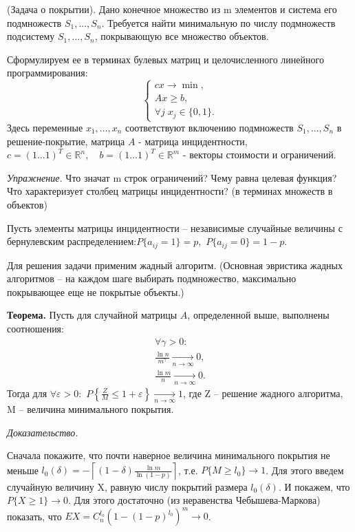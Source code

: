\begin{problem}

(Задача о покрытии). Дано конечное множество из m элементов и система его подмножеств $S_{1} ,...,S_{n} $. Требуется найти минимальную по числу подмножеств подсистему $S_{1} ,...,S_{n} $, покрывающую все множество объектов. 

\noindent Сформулируем ее в терминах булевых матриц и целочисленного линейного программирования:
\[\left\{\begin{array}{l} {cx\to \min ,} \\ {Ax\ge b,} \\ {\forall j\; x_{j} \in \{ 0,1\} .} \end{array}\right. \] 
Здесь переменные $x_{1} ,...,x_{n} $ соответствуют включению подмножеств $S_{1} ,...,S_{n} $ в решение-покрытие, матрица $A$ - матрица инцидентности, $c=(1...1)^{T} \in {\mathbb R}^{n} ,\quad b=(1...1)^{T} \in {\mathbb R}^{m} $ - векторы стоимости и ограничений.

\noindent \textit{Упражнение.} Что значат m строк ограничений? Чему равна целевая функция?  Что характеризует столбец матрицы инцидентности? (в терминах множеств в объектов)

\noindent Пусть элементы матрицы инцидентности -- независимые случайные величины с бернулевским распределением:$P\{ a_{ij} =1\} =p,$ $P\{ a_{ij} =0\} =1-p$. 

\noindent Для решения задачи применим жадный алгоритм. (Основная эвристика жадных алгоритмов -- на каждом шаге выбирать подмножество, максимально покрывающее еще не покрытые объекты.) 

\noindent \textbf{Теорема.} Пусть для случайной матрицы $A$, определенной выше, выполнены соотношения:
\[\begin{array}{l} {\forall \gamma >0:} \\ {\frac{\ln n}{m^{\gamma } } \mathop{\to }\limits_{n\to \infty } 0,} \\ {\frac{\ln m}{n} \mathop{\to }\limits_{n\to \infty } 0.} \end{array}\] 
Тогда для $\forall \varepsilon >0:$ $P\left\{\frac{Z}{M} \le 1+\varepsilon \right\}\mathop{\to }\limits_{n\to \infty } 1$, где Z -- решение жадного алгоритма, M -- величина минимального покрытия. 

\noindent \textit{Доказательство. }

\noindent Сначала покажите, что почти наверное величина минимального покрытия не меньше $l_{0} (\delta )=-\left\lceil (1-\delta )\frac{\ln m}{\ln (1-p)} \right\rceil $, т.е. $P\{ M\ge l_{0} \} \to 1$. Для этого введем случайную величину X, равную числу покрытий размера $l_{0} (\delta )$. И покажем, что $P\{ X\ge 1\} \to 0$. Для этого достаточно (из неравенства Чебышева-Маркова) показать, что $EX=C_{n}^{l_{o} } (1-(1-p)^{l_{0} } )^{m} \to 0$. 


\end{problem}
